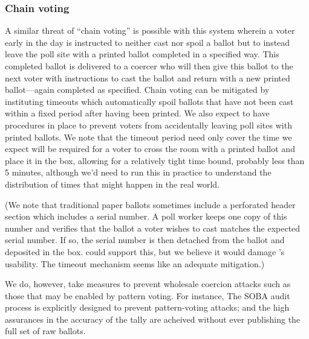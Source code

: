 \subsubsection{Chain voting}
A similar threat of ``chain voting'' is possible with this system wherein a voter early in the day is instructed to neither cast nor spoil a ballot but to instead leave the poll site with a printed ballot completed in a specified way.  This completed ballot is delivered to a coercer who will then give this ballot to the next voter with instructions to cast the ballot and return with a new printed ballot---again completed as specified.  Chain voting can be mitigated by instituting timeouts which automatically spoil ballots that have not been cast within a fixed period after having been printed. We also expect to have procedures in place to prevent voters from accidentally leaving poll sites with printed ballots. We note that the timeout period need only cover the time we expect will be required for a voter to cross the room with a printed ballot and place it in the box, allowing for a relatively tight time bound, probably less than 5 minutes, although we'd need to run this in practice to understand the distribution of times that might happen in the real world.

(We note that traditional paper ballots sometimes include a perforated header section which includes a serial number. A poll worker keeps one copy of this number and verifies that the ballot a voter wishes to cast matches the expected serial number. If so, the serial number is then detached from the ballot and deposited in the box. \projname could support this, but we believe it would damage \projname's usability. The timeout mechanism seems like an adequate mitigation.)

We do, however, take measures to prevent wholesale coercion attacks such as those that may be enabled by pattern voting.  For instance, The SOBA audit process is explicitly designed to prevent pattern-voting attacks; and the high assurances in the accuracy of the tally are acheived without ever publishing the full set of raw ballots.


